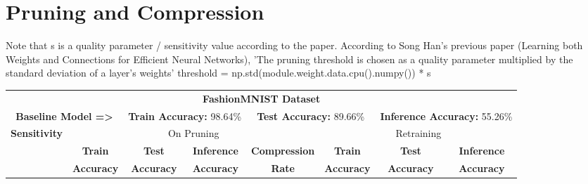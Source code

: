 \section{Pruning and Compression}\label{pruning}


Note that s is a quality parameter / sensitivity value according to the paper.
  According to Song Han's previous paper (Learning both Weights and Connections for Efficient Neural Networks),
  'The pruning threshold is chosen as a quality parameter multiplied by the standard deviation of a layer’s weights'
threshold = np.std(module.weight.data.cpu().numpy()) * s

\begin{table*}[!htb]
\begin{center}
\renewcommand\arraystretch{1.5}
\fontsize{6.7pt}{6.7pt}\selectfont
\begin{tabular}{|c|c|c|c|c|c|c|c|}
\hline
\multicolumn{8}{|c|}{\textbf{FashionMNIST Dataset}}\\
\multicolumn{2}{|c}{\textbf{Baseline Model =>}} & \multicolumn{2}{c}{\textbf{Train Accuracy:} 98.64\%} & \multicolumn{2}{c}{\textbf{Test Accuracy:} 89.66\%} & \multicolumn{2}{c|}{\textbf{Inference Accuracy:} 55.26\%}\\
\hline
\multirow{3}{*}{\textbf{Sensitivity}} & \multicolumn{4}{|c|}{On Pruning} & \multicolumn{3}{|c|}{Retraining}\\
\hline
 & \textbf{Train}  & \textbf{Test}  & \textbf{Inference}  & \textbf{Compression} & \textbf{Train}  & \textbf{Test}  & \textbf{Inference}  \\
                      & \textbf{Accuracy} & \textbf{Accuracy} & \textbf{Accuracy} & \textbf{Rate} & \textbf{Accuracy} & \textbf{Accuracy} & \textbf{Accuracy}  \\


\end{tabular}
\end{center}
\end{table*}
